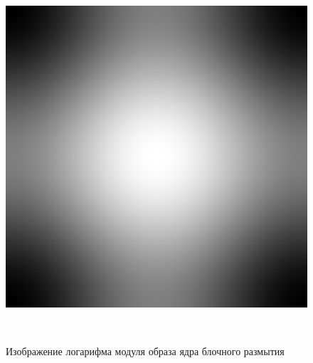\documentclass[a4paper]{article}
\begin{document}
\begin{figure}[H]
    \centering
    \includegraphics[width=0.51\linewidth]{2/3_abs_fourier_log_norm_gaussian.png}
    \caption{Изображение логарифма модуля образа ядра блочного размытия}\
    

\end{figure}
\end{document}
